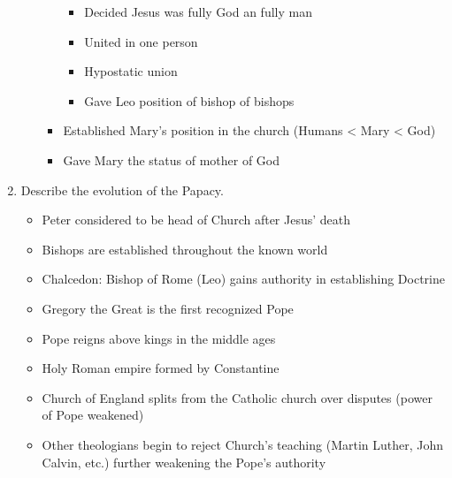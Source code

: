 \documentclass[8pt]{article}
\begin{document}
\begin{enumerate}
\begin{enumerate}
\begin{itemize}
\begin{itemize}
                \item Decided Jesus was fully God an fully man
                \item United in one person
                \item Hypostatic union
                \item Gave Leo position of bishop of bishops
            \end{itemize}
            \item Established Mary's position in the church (Humans < Mary < God)
            \item Gave Mary the status of mother of God
        \end{itemize}
    \end{enumerate}

    \item Describe the evolution of the Papacy.
    \begin{itemize}
        \item Peter considered to be head of Church after Jesus' death
        \item Bishops are established throughout the known world
        \item Chalcedon: Bishop of Rome (Leo) gains authority in establishing Doctrine
        \item Gregory the Great is the first recognized Pope
        \item Pope reigns above kings in the middle ages
        \item Holy Roman empire formed by Constantine
        \item Church of England splits from the Catholic church over disputes (power of Pope weakened)
        \item Other theologians begin to reject Church's teaching (Martin Luther, John Calvin, etc.) further weakening the Pope's authority
    \end{itemize}


\end{enumerate}
\end{document}
